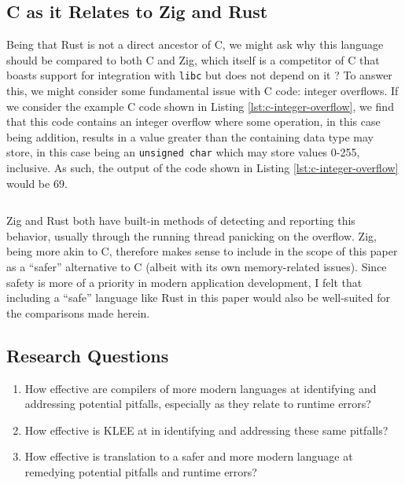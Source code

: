 \documentclass[conference]{IEEEtran}
\newenvironment{code}{\captionsetup{type=listing}}{}
\begin{document}
\subsection{C as it Relates to Zig and Rust}
Being that Rust is not a direct ancestor of C, we might ask why this language
should be compared to both C and Zig, which itself is a competitor of C that
boasts support for integration with \texttt{libc} but does not depend on it
\cite{zig2025overview}? To answer this, we might consider some fundamental issue
with C code: integer overflows. If we consider the example C code shown in
Listing \ref{lst:c-integer-overflow}, we find that this code contains an
integer overflow where some operation, in this case being addition, results in a
value greater than the containing data type may store, in this case being an
\texttt{unsigned char} which may store values 0-255, inclusive. As such, the
output of the code shown in Listing \ref{lst:c-integer-overflow} would be 69.

\begin{code}
    \inputminted{c}{../code-examples/c/integer-overflow.c}
    \label{lst:c-integer-overflow}
\end{code}

Zig and Rust both have built-in methods of detecting and reporting this behavior,
usually through the running thread panicking on the overflow. Zig, being more akin
to C, therefore makes sense to include in the scope of this paper as a ``safer''
alternative to C (albeit with its own memory-related issues). Since safety is more
of a priority in modern application development, I felt that including a ``safe''
language like Rust in this paper would also be well-suited for the comparisons made
herein.

\subsection{Research Questions}
\begin{enumerate}
    \item How effective are compilers of more modern languages at identifying and
        addressing potential pitfalls, especially as they relate to runtime errors?
    \item How effective is KLEE at in identifying and addressing these same
        pitfalls?
    \item How effective is translation to a safer and more modern language at
        remedying potential pitfalls and runtime errors?
\end{enumerate}
\end{document}
